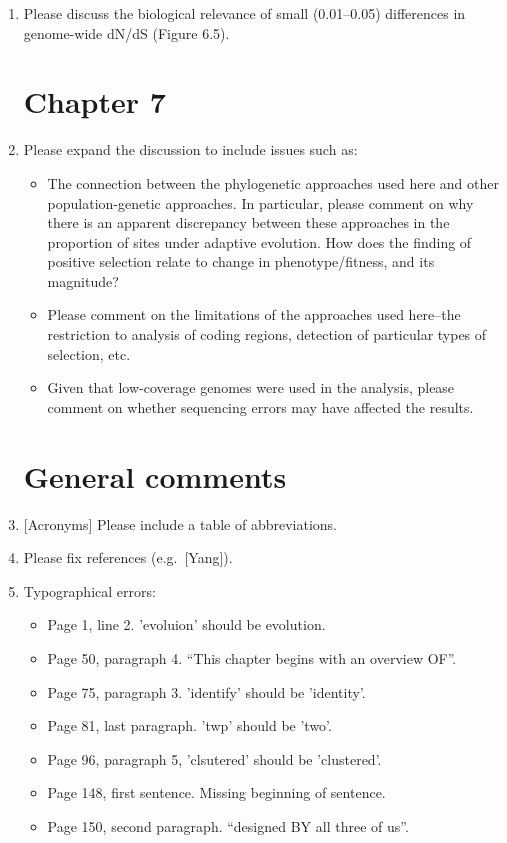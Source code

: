 \begin{enumerate}
\item{ Please discuss the
  biological relevance of small (0.01--0.05) differences in
  genome-wide dN/dS (Figure 6.5).

}

\section{Chapter 7}

\item{Please expand the discussion to include issues such as:
  \begin{itemize}
  \item{The connection between the phylogenetic approaches used here
    and other population-genetic approaches. In particular, please
    comment on why there is an apparent discrepancy between these
    approaches in the proportion of sites under adaptive
    evolution. How does the finding of positive selection relate to
    change in phenotype/fitness, and its magnitude?}
  \item{Please comment on the limitations of the approaches used
    here--the restriction to analysis of coding regions, detection of
    particular types of selection, etc.}
  \item{Given that low-coverage genomes were used in the analysis,
    please comment on whether sequencing errors may have affected the
    results.}
  \end{itemize}
}

\section{General comments}

\item{[Acronyms] Please include a table of abbreviations.

}

\item{Please fix references (e.g.\ [Yang]).}

\item{Typographical errors:
  \begin{itemize}
  \item{Page 1, line 2. 'evoluion' should be evolution.}
  \item{Page 50, paragraph 4. “This chapter begins with an overview
    OF”.}
  \item{Page 75, paragraph 3. 'identify' should be 'identity'.}
  \item{Page 81, last paragraph. 'twp' should be 'two'.}
  \item{Page 96, paragraph 5, 'clsutered' should be 'clustered'.}
  \item{Page 148, first sentence. Missing beginning of sentence.}
  \item{Page 150, second paragraph. “designed BY all three of us”.}
  \end{itemize}
}
\end{enumerate}
